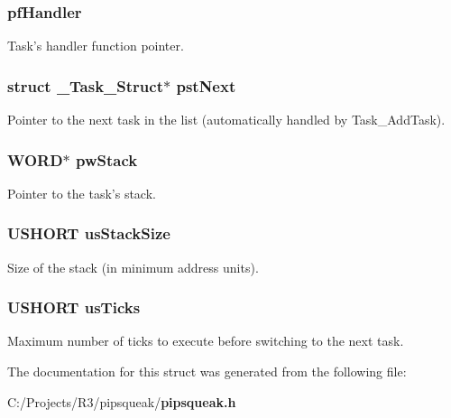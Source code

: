 \subsubsection[{pfHandler}]{ {\bf pfHandler}}\label{struct___task___struct_a61e5014f166bc9ea25bbcc4efae29070}


Task's handler function pointer. 
\subsubsection[{pstNext}]{\setlength{\rightskip}{0pt plus 5cm}struct {\bf \_\-Task\_\-Struct}$\ast$ {\bf pstNext}}\label{struct___task___struct_a9d37430a30c5eeeedc965e34cdd56a9e}


Pointer to the next task in the list (automatically handled by Task\_\-AddTask). 
\subsubsection[{pwStack}]{\setlength{\rightskip}{0pt plus 5cm}WORD$\ast$ {\bf pwStack}}\label{struct___task___struct_a4ce087c68a76632ef0a9fccc4b965d18}


Pointer to the task's stack. 
\subsubsection[{usStackSize}]{\setlength{\rightskip}{0pt plus 5cm}USHORT {\bf usStackSize}}\label{struct___task___struct_a6a09c83344444fed49be0f978ec54cf2}


Size of the stack (in minimum address units). 
\subsubsection[{usTicks}]{\setlength{\rightskip}{0pt plus 5cm}USHORT {\bf usTicks}}\label{struct___task___struct_a685cc1f03df500e134a3d3703834d461}


Maximum number of ticks to execute before switching to the next task. 

The documentation for this struct was generated from the following file:\begin{DoxyCompactItemize}
\item 
C:/Projects/R3/pipsqueak/{\bf pipsqueak.h}\end{DoxyCompactItemize}
